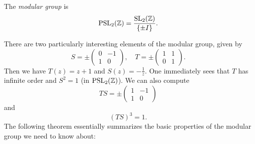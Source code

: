 \documentclass[a4paper]{article}
\begin{document}
\begin{defi}
  The \emph{modular group} is
  \[
    \mathrm{PSL}_2(\mathbb{Z}) = \frac{\mathrm{SL}_2(\mathbb{Z})}{\{\pm I\}}.
  \]
\end{defi}
There are two particularly interesting elements of the modular group, given by
\[
  S = \pm
  \begin{pmatrix}
    0 & -1\\
    1 & 0
  \end{pmatrix},\quad
  T = \pm
  \begin{pmatrix}
    1 & 1\\
    0 & 1
  \end{pmatrix}.
\]
Then we have $T(z) = z + 1$ and $S(z) = -\frac{1}{z}$. One immediately sees that $T$ has infinite order and $S^2 = 1$ (in $\mathrm{PSL}_2(\mathbb{Z})$). We can also compute
\[
  TS = \pm
  \begin{pmatrix}
    1 & -1\\
    1 & 0
  \end{pmatrix}
\]
and
\[
  (TS)^3 = 1.
\]
The following theorem essentially summarizes the basic properties of the modular group we need to know about:
\end{document}
